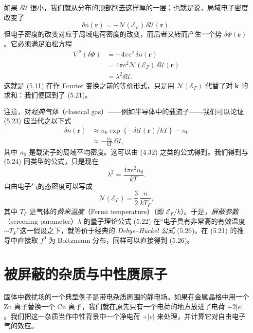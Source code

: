如果 $\delta\mathcal{U}$ 很小，我们就从分布的顶部削去这样厚的一层；也就是说，局域电子密度改变了
\begin{equation*}
\delta n(\mathbf{r})=-\mathcal{N}(\mathcal{E}_{F})\,\delta\mathcal{U}(\mathbf{r}).
\tag{5.23}
\end{equation*}
但电子密度的改变对应于局域电荷密度的改变，而后者又转而产生一个势 $\delta\Phi(\mathbf{r})$。它必须满足泊松方程
\begin{align*}
\nabla^{2}(\delta\Phi)&=-4\pi e^{2}\,\delta n(\mathbf{r})\\
&=4\pi e^{2}\mathcal{N}(\mathcal{E}_{F})\,\delta\mathcal{U}(\mathbf{r})\\
&=\lambda^{2}\delta\mathcal{U}.
\tag{5.24}
\end{align*}
这就是 (5.11) 在作 Fourier 变换之前的等价形式，只是用 $\mathcal{N}(\mathcal{E}_{F})$ 代替了对 $\mathbf{k}$ 的求和：我们便回到了 (5.21)。

注意，对\emph{经典气体}（classical gas）——例如半导体中的载流子——我们可以论证 (5.23) 应当代之以下式
\begin{align*}
\delta n(\mathbf{r})&\approx n_{0}\exp\left\{-\delta\mathcal{U}(\mathbf{r})/kT\right\}-n_{0}\\
&\approx-\frac{n_{0}}{kT}\,\delta\mathcal{U},
\tag{5.25}
\end{align*}
其中 $n_{0}$ 是载流子的局域平均密度。这可以由 (4.32) 之类的公式得到。我们得到与 (5.24) 同类型的公式，只是现在
\begin{equation*}
\lambda^{2}=\frac{4\pi e^{2}n_{0}}{kT}.
\tag{5.26}
\end{equation*}
自由电子气的态密度可以写成
\begin{equation*}
\mathcal{N}(\mathcal{E}_{F})=\frac{3}{2}\,\frac{n}{kT_{F}},
\tag{5.27}
\end{equation*}
其中 $T_{F}$ 是气体的\emph{费米温度}（Fermi temperature）（即 $\mathcal{E}_{F}/k$）。于是，\emph{屏蔽参数}（screening parameter）$\lambda$ 的量子理论公式 (5.22) 在“电子具有非常高的有效温度 $\sim T_{F}$”这一假设之下，就等价于经典的 \emph{Debye--Hückel 公式} (5.26)。在 (5.21) 的推导中直接取 $f^{0}$ 为 Boltzmann 分布，同样可以直接得到 (5.26)。

\section{被屏蔽的杂质与中性赝原子}

固体中微扰场的一个典型例子是带电杂质周围的静电场。如果在金属晶格中用一个 Zn 离子替换一个 Cu 离子，我们就在原先只有一个电荷的地方放进了电荷 $+2|e|$。我们把这一杂质当作中性背景中一个净电荷 $+|e|$ 来处理，并计算它对自由电子气的效应。

